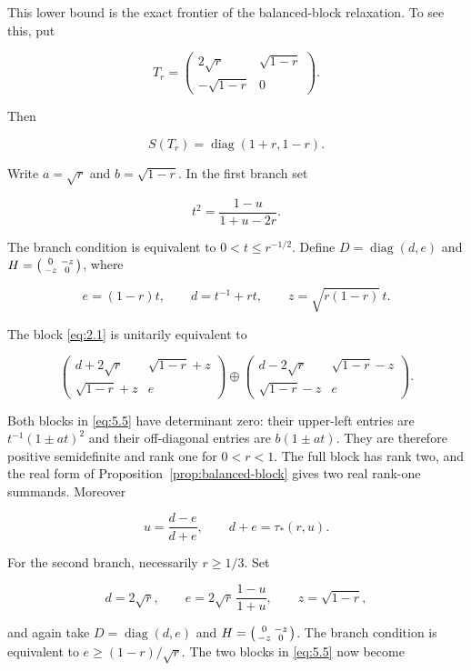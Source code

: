 \documentclass[11pt]{article}
\begin{document}
This lower bound is the exact frontier of the balanced-block relaxation. To see
this, put

\[
T_r=\begin{pmatrix}2\sqrt r&\sqrt{1-r}\\-\sqrt{1-r}&0\end{pmatrix}.
\tag{5.2}\label{eq:5.2}
\]

Then

\[
S(T_r)=\operatorname{diag}(1+r,1-r).
\tag{5.3}\label{eq:5.3}
\]

Write $a=\sqrt r$ and $b=\sqrt{1-r}$. In the first branch set

\[
t^2=\frac{1-u}{1+u-2r}.
\]

The branch condition is equivalent to $0<t\le r^{-1/2}$. Define
$D=\operatorname{diag}(d,e)$ and
$H=\begin{psmallmatrix}0&-z\\-z&0\end{psmallmatrix}$, where

\[
e=(1-r)t,\qquad d=t^{-1}+rt,\qquad
z=\sqrt{r(1-r)}\,t.
\tag{5.4}\label{eq:5.4}
\]

The block \eqref{eq:2.1} is unitarily equivalent to

\[
\begin{pmatrix}d+2\sqrt r&\sqrt{1-r}+z\\
\sqrt{1-r}+z&e\end{pmatrix}
\oplus
\begin{pmatrix}d-2\sqrt r&\sqrt{1-r}-z\\
\sqrt{1-r}-z&e\end{pmatrix}.
\tag{5.5}\label{eq:5.5}
\]

Both blocks in \eqref{eq:5.5} have determinant zero: their upper-left entries are
$t^{-1}(1\pm at)^2$ and their off-diagonal entries are $b(1\pm at)$.
They are therefore positive semidefinite and rank one for $0<r<1$. The full
block has rank two, and the real form of Proposition~\ref{prop:balanced-block} gives two real rank-one
summands. Moreover

\[
u=\frac{d-e}{d+e},
\qquad d+e=\tau_*(r,u).
\]

For the second branch, necessarily $r\ge1/3$. Set

\[
d=2\sqrt r,
\qquad e=2\sqrt r\,\frac{1-u}{1+u},
\qquad z=\sqrt{1-r},
\]

and again take $D=\operatorname{diag}(d,e)$ and
$H=\begin{psmallmatrix}0&-z\\-z&0\end{psmallmatrix}$. The branch condition is
equivalent to $e\ge(1-r)/\sqrt r$. The two blocks in \eqref{eq:5.5} now become
\end{document}

